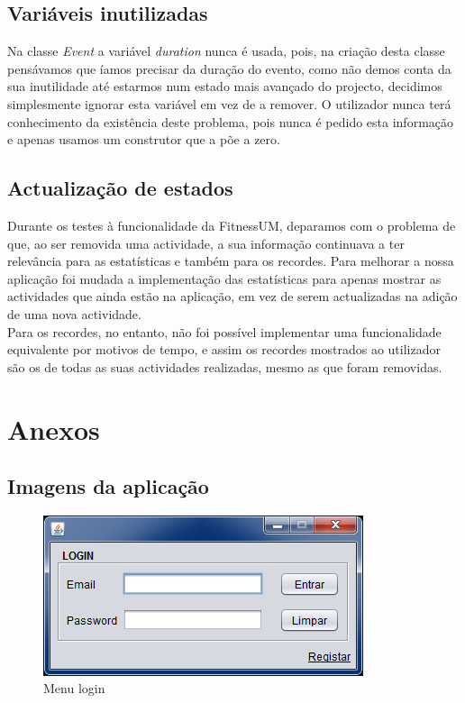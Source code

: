 \documentclass[12pt,notitlepage]{article}
\begin{document}
\subsection{Variáveis inutilizadas}
Na classe \textit{Event} a variável \textit{duration} nunca é usada, pois, na criação desta classe pensávamos que íamos precisar da duração do evento, como não demos conta da sua inutilidade até estarmos num estado mais avançado do projecto, decidimos simplesmente ignorar esta variável em vez de a remover. O utilizador nunca terá conhecimento da existência deste problema, pois nunca é pedido esta informação e apenas usamos um construtor que a põe a zero.

\subsection{Actualização de estados}
Durante os testes à funcionalidade da FitnessUM, deparamos com o problema de que, ao ser removida uma actividade, a sua informação continuava a ter relevância para as estatísticas e também para os recordes.
Para melhorar a nossa aplicação foi mudada a implementação das estatísticas para apenas mostrar as actividades que ainda estão na aplicação, em vez de serem actualizadas na adição de uma nova actividade.\\
Para os recordes, no entanto, não foi possível implementar uma funcionalidade equivalente por motivos de tempo, e assim os recordes mostrados ao utilizador são os de todas as suas actividades realizadas, mesmo as que foram removidas.

\newpage

\section{Anexos}
\subsection{Imagens da aplicação}

\begin{figure}[h]
\centering
\includegraphics[scale=0.7]{login.png}
\caption{Menu login}
\end{figure}
\end{document}
